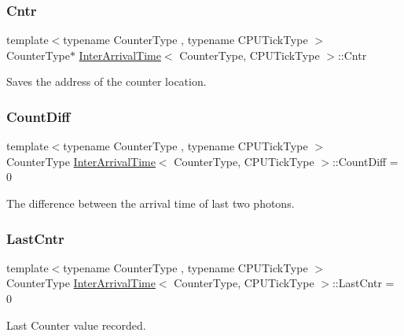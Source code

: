 \subsubsection{\texorpdfstring{Cntr}{Cntr}}
{\footnotesize\ttfamily template$<$typename Counter\+Type , typename C\+P\+U\+Tick\+Type $>$ \\
Counter\+Type$\ast$ \hyperlink{classInterArrivalTime}{Inter\+Arrival\+Time}$<$ Counter\+Type, C\+P\+U\+Tick\+Type $>$\+::Cntr}



Saves the address of the counter location. 

\mbox{\label{classInterArrivalTime_ac73e4d6bbfc5daea67b53723ede5e9fd}} 
\subsubsection{\texorpdfstring{Count\+Diff}{CountDiff}}
{\footnotesize\ttfamily template$<$typename Counter\+Type , typename C\+P\+U\+Tick\+Type $>$ \\
Counter\+Type \hyperlink{classInterArrivalTime}{Inter\+Arrival\+Time}$<$ Counter\+Type, C\+P\+U\+Tick\+Type $>$\+::Count\+Diff = 0}



The difference between the arrival time of last two photons. 

\mbox{\label{classInterArrivalTime_a8a24e1acb445c45b2934955fb0dcc8f5}} 
\subsubsection{\texorpdfstring{Last\+Cntr}{LastCntr}}
{\footnotesize\ttfamily template$<$typename Counter\+Type , typename C\+P\+U\+Tick\+Type $>$ \\
Counter\+Type \hyperlink{classInterArrivalTime}{Inter\+Arrival\+Time}$<$ Counter\+Type, C\+P\+U\+Tick\+Type $>$\+::Last\+Cntr = 0}



Last Counter value recorded. 

\mbox{\label{classInterArrivalTime_a108e8d20e7a26f7b9b6ac75c38632cd0}} 
